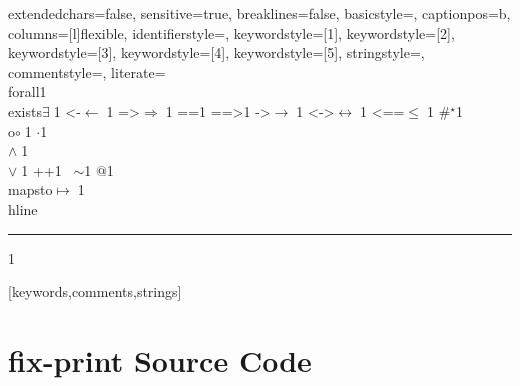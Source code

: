 {    extendedchars=false,
    sensitive=true,
    breaklines=false,
    basicstyle=\small,
    captionpos=b,
    columns=[l]flexible,
    identifierstyle={\ttfamily\color{black}},
    keywordstyle=[1]{\ttfamily\color{violet}},
    keywordstyle=[2]{\ttfamily\color{green}},
    keywordstyle=[3]{\ttfamily\color{ltblue}},
    keywordstyle=[4]{\ttfamily\color{blue}},
    keywordstyle=[5]{\ttfamily\color{red}},
    stringstyle=\ttfamily,
    commentstyle={\ttfamily\color{dkgreen}},
    literate=
    {\\forall}{{\color{dkgreen}{$\forall\;$}}}1
    {\\exists}{{$\exists\;$}}1
    {<-}{{$\leftarrow\;$}}1
    {=>}{{$\Rightarrow\;$}}1
    {==}{{\code{==}\;}}1
    {==>}{{\code{==>}\;}}1
    {->}{{$\rightarrow\;$}}1
    {<->}{{$\leftrightarrow\;$}}1
    {<==}{{$\leq\;$}}1
    {\#}{{$^\star$}}1 
    {\\o}{{$\circ\;$}}1 
    {\@}{{$\cdot$}}1 
    {\/\\}{{$\wedge\;$}}1
    {\\\/}{{$\vee\;$}}1
    {++}{{\code{++}}}1
    {~}{{$\sim$}}1
    {\@\@}{{$@$}}1
    {\\mapsto}{{$\mapsto\;$}}1
    {\\hline}{{\rule{\linewidth}{0.5pt}}}1
}[keywords,comments,strings]

\section{fix-print Source Code}
\label{appendix:Source-Code}

